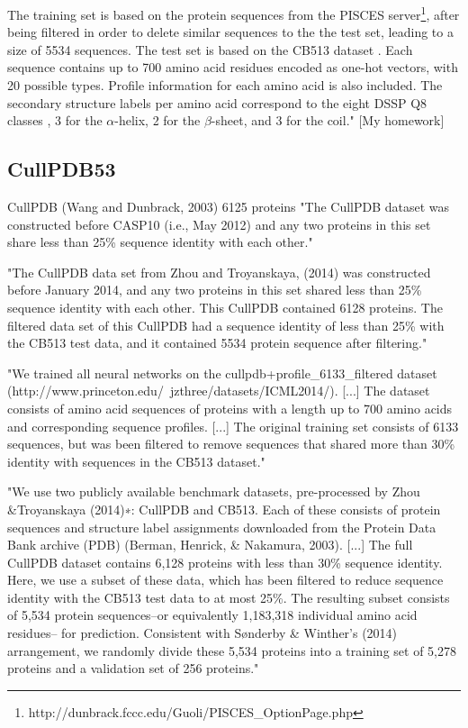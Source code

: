 The training set is based on the protein sequences from the PISCES server\footnote{http://dunbrack.fccc.edu/Guoli/PISCES\_OptionPage.php}, after being filtered in order to delete similar sequences to the the test set, leading to a size of 5534 sequences. The test set is based on the CB513 dataset \cite{Avdagic2009}. Each sequence contains up to 700 amino acid residues encoded as one-hot vectors, with 20 possible types. Profile information for each amino acid is also included. The secondary structure labels per amino acid correspond to the eight DSSP Q8 classes \cite{Kabsch1983}, 3 for the $\alpha$-helix, 2 for the $\beta$-sheet, and 3 for the coil." [My homework]

\subsection{CullPDB53}
CullPDB (Wang and Dunbrack, 2003)
6125 proteins
"The CullPDB dataset was constructed before CASP10 (i.e., May 2012) and any two proteins in this set share less than 25\% sequence identity with each other." \cite{Wang2016}

"The CullPDB data set from Zhou and Troyanskaya, (2014) was constructed before January 2014, and any two proteins in this set shared less than 25\% sequence identity with each other. This CullPDB contained 6128 proteins. The filtered data set of this CullPDB had a sequence identity of less than 25\% with the CB513 test data, and it contained 5534 protein sequence after filtering." \cite{Fang2017}

"We trained all neural networks on the cullpdb+profile\_6133\_filtered dataset (http://www.princeton.edu/~jzthree/datasets/ICML2014/). [...] The dataset consists of amino acid sequences of proteins with a length up to 700 amino acids and corresponding sequence profiles. [...] The original training set consists of 6133 sequences, but was been filtered to remove sequences that shared more than 30\% identity with sequences in the CB513 dataset." \cite{Jurtz2017}

"We use two publicly available benchmark datasets, pre-processed by Zhou \&Troyanskaya (2014)∗: CullPDB and CB513. Each of these consists of protein sequences and structure label assignments downloaded from the Protein Data Bank archive (PDB) (Berman, Henrick, \& Nakamura, 2003). [...] The full CullPDB dataset contains 6,128 proteins with less than 30\% sequence identity. Here, we use a subset of these data, which has been filtered to reduce sequence identity with the CB513 test data to at most 25\%. The resulting subset consists of 5,534 protein sequences–or equivalently 1,183,318 individual amino acid residues– for prediction. Consistent with Sønderby \& Winther’s (2014) arrangement, we randomly divide these 5,534 proteins into a training set of 5,278 proteins and a validation set of 256 proteins." \cite{Busia2017}
